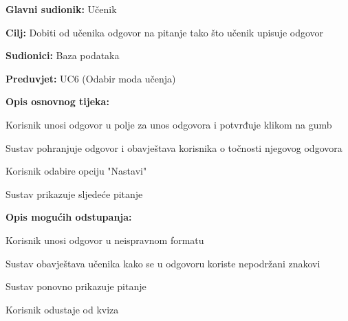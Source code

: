 					\noindent {}
					\begin{packed_item}
						
						\item \textbf{Glavni sudionik: }Učenik
						\item  \textbf{Cilj:} Dobiti od učenika odgovor na pitanje tako što učenik upisuje odgovor
						\item  \textbf{Sudionici:} Baza podataka
						\item  \textbf{Preduvjet:} UC6 (Odabir moda učenja)
						\item  \textbf{Opis osnovnog tijeka:}
						
						\item[] \begin{packed_enum}
							
							\item Korisnik unosi odgovor u polje za unos odgovora i potvrđuje klikom na gumb
							\item Sustav pohranjuje odgovor i obavještava korisnika o točnosti njegovog odgovora
							\item Korisnik odabire opciju "Nastavi"
							\item Sustav prikazuje sljedeće pitanje
						\end{packed_enum}
						
						\item  \textbf{Opis mogućih odstupanja:}
						
						\item[] \begin{packed_item}
							
							\item[1.a] Korisnik unosi odgovor u neispravnom formatu 
							\item[] \begin{packed_enum}
								
								\item Sustav obavještava učenika kako se u odgovoru koriste nepodržani znakovi
								\item Sustav ponovno prikazuje pitanje
								
							\end{packed_enum}
								
							
							\item[3.a] Korisnik odustaje od kviza
							\item[] \begin{packed_enum}
								

\end{packed_enum}
\end{packed_item}
\end{packed_item}
